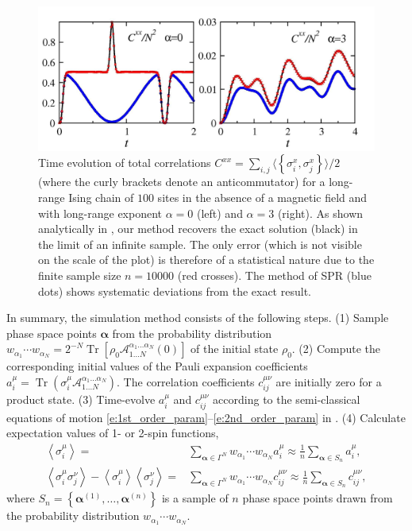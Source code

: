 \documentclass[aps,prl,showpacs,amsmath,amssymb,superscriptaddress,reprint,10pt]{revtex4-1}
\newcommand{\mvec}[1]{\boldsymbol #1}
\DeclareMathOperator{\Tr}{{Tr}}
\begin{document}
\begin{figure}\centering
\includegraphics[width=\linewidth]{./Ising_Schach_N100_alph_0_3_nt10000.jpg}
\caption{\label{f:Ising}%
Time evolution of total correlations $C^{xx}=\sum_{i,j}\langle\left\{\sigma_i^x,\sigma_j^x\right\}\rangle/2$ (where the curly brackets denote an anticommutator) for a long-range Ising chain of $100$ sites in the absence of a magnetic field and with long-range exponent $\alpha=0$ (left) and $\alpha=3$ (right). As shown analytically in \cite{Note1}, our method recovers the exact solution (black) in the limit of an infinite sample. The only error (which is not visible on the scale of the plot) is therefore of a statistical nature due to the finite sample size $n=10000$ (red crosses). The method of SPR (blue dots) shows systematic deviations from the exact result.
}%
\end{figure}

In summary, the simulation method consists of the following steps. (1) Sample phase space points $\mvec{\alpha}$ from the probability distribution $w_{\alpha_1}\cdots w_{\alpha_N}=2^{-N}\Tr\left[\rho_0 \mathscr{A}_{1\dotsc N}^{\alpha_1\dotsc\alpha_N}(0)\right]$ of the initial state $\rho_0$. (2) Compute the corresponding initial values of the Pauli expansion coefficients $a_i^\mu=\Tr\left(\sigma_i^\mu \mathscr{A}_{1\dotsc N}^{\alpha_1\dotsc\alpha_N}\right)$. The correlation coefficients $c_{ij}^{\mu\nu}$ are initially zero for a product state. (3) Time-evolve $a_i^\mu$ and $c_{ij}^{\mu\nu}$ according to the semi-classical equations of motion \eqref{e:1st_order_param}--\eqref{e:2nd_order_param} in \cite{Note1}. (4) Calculate expectation values of 1- or 2-spin functions,
\begin{subequations}
\begin{align}
\left\langle\sigma_i^\mu\right\rangle =& \sum_{\mvec{\alpha}\in\Gamma^N}w_{\alpha_1}\cdots w_{\alpha_N} a_i^\mu \approx \frac{1}{n}\sum_{\mvec{\alpha}\in S_n} a_i^\mu,\label{e:1spin}\\
\left\langle\sigma_i^\mu\sigma_j^\nu\right\rangle - \left\langle\sigma_i^\mu\right\rangle\left\langle\sigma_j^\nu\right\rangle =& \!\sum_{\mvec{\alpha}\in\Gamma^N}\!w_{\alpha_1}\cdots w_{\alpha_N} c_{ij}^{\mu\nu} \approx \frac{1}{n}\sum_{\mvec{\alpha}\in S_n}\! c_{ij}^{\mu\nu},\label{e:2spin}
\end{align}
\end{subequations}
where $S_n=\left\{\mvec{\alpha}^{(1)},\dots,\mvec{\alpha}^{(n)}\right\}$ is a sample of $n$ phase space points drawn from the probability distribution $w_{\alpha_1}\cdots w_{\alpha_N}$.
\end{document}
